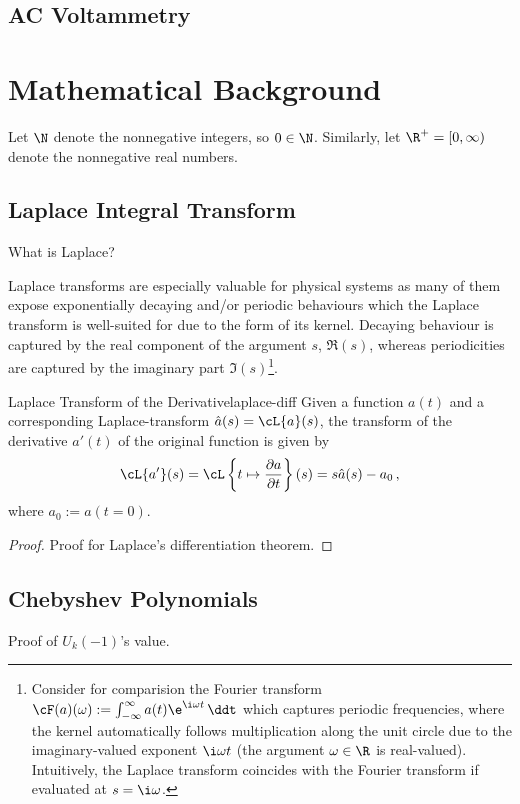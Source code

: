 \documentclass{prettytex/ox/mmsc-special-topic}
\begin{document}
  \subsection{AC Voltammetry}

  \section{Mathematical Background}
  Let $\N$ denote the nonnegative integers, so $0 \in \N$.
  Similarly, let $\R^+ = [0, \infty)$ denote the nonnegative real numbers.

  \subsection{Laplace Integral Transform}
  What is Laplace?

  Laplace transforms are especially valuable for physical systems as many of them expose exponentially decaying and/or periodic behaviours which the Laplace transform is well-suited for due to the form of its kernel.
  Decaying behaviour is captured by the real component of the argument $s$, $\Re(s)$, whereas periodicities are captured by the imaginary part $\Im(s)$\footnote{Consider for comparision the Fourier transform $\cF(a)(\omega) := \int_{-\infty}^{\infty} a(t) \e^{\i \omega t} \,\ddt$ which captures periodic frequencies, where the kernel automatically follows multiplication along the unit circle due to the imaginary-valued exponent $\i\omega t$ (the argument $\omega \in \R$ is real-valued). Intuitively, the Laplace transform coincides with the Fourier transform if evaluated at $s = \i \omega$.}.

  \begin{theorem}{Laplace Transform of the Derivative}{laplace-diff}
    Given a function $a(t)$ and a corresponding Laplace-transform $\hat{a}(s) = \cL\{a\}(s)$, the transform of the derivative $a'(t)$ of the original function is given by
    $$\cL\{a'\}(s) = \cL\left\{t \mapsto \frac{\partial a}{\partial t}\right\}(s) = s\hat{a}(s) - a_0\,,$$
    where $a_0 := a(t=0)$.
  \end{theorem}

  \begin{proof}
    Proof for Laplace's differentiation theorem.
  \end{proof}

  \subsection{Chebyshev Polynomials}
  Proof of $U_k(-1)$'s value.
\end{document}
